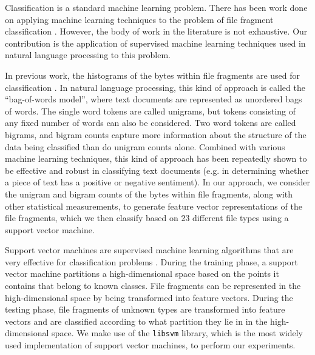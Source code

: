 \documentclass[letter,11pt]{article}
\begin{document}
Classification is a standard machine learning problem. There has been work done on applying machine learning techniques to the problem of file fragment classification \cite{Axelsson10, Conti10, Li10, Veenman07}. However, the body of work in the literature is not exhaustive. Our contribution is the application of supervised machine learning techniques used in natural language processing to this problem.

In previous work, the histograms of the bytes within file fragments are used for classification \cite{Li10, Veenman07}. In natural language processing, this kind of approach is called the ``bag-of-words model'', where text documents are represented as unordered bags of words. The single word tokens are called unigrams, but tokens consisting of any fixed number of words can also be considered. Two word tokens are called bigrams, and bigram counts capture more information about the structure of the data being classified than do unigram counts alone. Combined with various machine learning techniques, this kind of approach has been repeatedly shown to be effective and robust in classifying text documents (e.g. in determining whether a piece of text has a positive or negative sentiment). In our approach, we consider the unigram and bigram counts of the bytes within file fragments, along with other statistical measurements, to generate feature vector representations of the file fragments, which we then classify based on 23 different file types using a support vector machine.

Support vector machines are supervised machine learning algorithms that are very effective for classification problems \cite{Li10}. During the training phase, a support vector machine partitions a high-dimensional space based on the points it contains that belong to known classes. File fragments can be represented in the high-dimensional space by being transformed into feature vectors. During the testing phase, file fragments of unknown types are transformed into feature vectors and are classified according to what partition they lie in in the high-dimensional space. We make use of the \texttt{libsvm} \cite{CC01a} library, which is the most widely used implementation of support vector machines, to perform our experiments.
\end{document}
